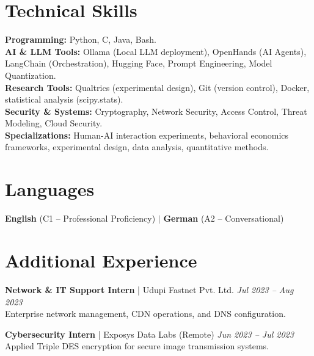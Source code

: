 \documentclass[a4paper,11pt]{article}
\begin{document}
\section{Technical Skills}
\textbf{Programming:} Python, C, Java, Bash. \\
\textbf{AI \& LLM Tools:} Ollama (Local LLM deployment), OpenHands (AI Agents), LangChain (Orchestration), Hugging Face, Prompt Engineering, Model Quantization. \\
\textbf{Research Tools:} Qualtrics (experimental design), Git (version control), Docker, statistical analysis (scipy.stats). \\
\textbf{Security \& Systems:} Cryptography, Network Security, Access Control, Threat Modeling, Cloud Security. \\
\textbf{Specializations:} Human-AI interaction experiments, behavioral economics frameworks, experimental design, data analysis, quantitative methods.

\section{Languages}
\textbf{English} (C1 – Professional Proficiency) \quad $|$ \quad \textbf{German} (A2 – Conversational)

\section{Additional Experience}
\textbf{Network \& IT Support Intern} | Udupi Fastnet Pvt. Ltd. \hfill \textit{Jul 2023 -- Aug 2023} \\
Enterprise network management, CDN operations, and DNS configuration.

\textbf{Cybersecurity Intern} | Exposys Data Labs (Remote) \hfill \textit{Jun 2023 -- Jul 2023} \\
Applied Triple DES encryption for secure image transmission systems.

\vfill
{}
\end{document}
